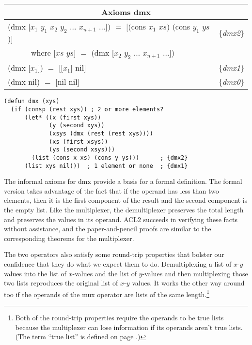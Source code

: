 \begin{center}
\begin{tabular}{ll}
\multicolumn{2}{c}{Axioms \textsf{dmx}}\\
\hline
\textsf{(dmx [$x_1$ $y_1$ $x_2$ $y_2$ $\dots$ $x_{n+1}$ $\dots$])} $=$ \textsf{[(cons $x_1$ $xs$) (cons $y_1$ $ys$)] }&\{\emph{dmx2}\} \\
~~~~~~where \textsf{[$xs$ $ys$]} $=$ \textsf{(dmx [$x_2$ $y_2$ $\dots$ $x_{n+1}$ $\dots$])}       &\\
\textsf{(dmx [$x_1$]) $=$  [[$x_1$] nil]}                                                         &\{\emph{dmx1}\} \\
\textsf{(dmx nil) $=$ [nil nil] }                                                                 &\{\emph{dmx0}\} \\
\end{tabular}
\end{center}
\label{dmx-defun}
\begin{code}
\begin{verbatim}
(defun dmx (xys)
  (if (consp (rest xys)) ; 2 or more elements?
      (let* ((x (first xys))
             (y (second xys))
             (xsys (dmx (rest (rest xys))))
             (xs (first xsys))
             (ys (second xsys)))
        (list (cons x xs) (cons y ys)))      ; {dmx2}
      (list xys nil)))  ; 1 element or none  ; {dmx1}
\end{verbatim}
\end{code}

The informal axioms for \textsf{dmx} provide a basis for a formal definition.
The formal version takes advantage of the fact that if the operand
has less than two elements, then it is the first component of the result
and the second component is the empty list.
Like the multiplexer,
the demultiplexer preserves the total length
and preserves the values in its operand.
ACL2 succeeds in verifying these facts without assistance,
and the paper-and-pencil proofs are similar to the corresponding
theorems for the multiplexer.

The two operators also satisfy some round-trip properties
that bolster our confidence that they do what we expect them to do.
Demultiplexing a list of $x$-$y$ values into the list of
$x$-values and the list of $y$-values and then multiplexing
those two lists reproduces the original list of $x$-$y$ values.
It works the other way around too if the operands of
the \textsf{mux} operator are lists of the same length.\footnote{Both
of the round-trip properties require the operands to be
true lists because the multiplexer can lose information
if its operands aren't true lists.
(The term ``true list'' is defined on page \pageref{true-list-def}.)}

